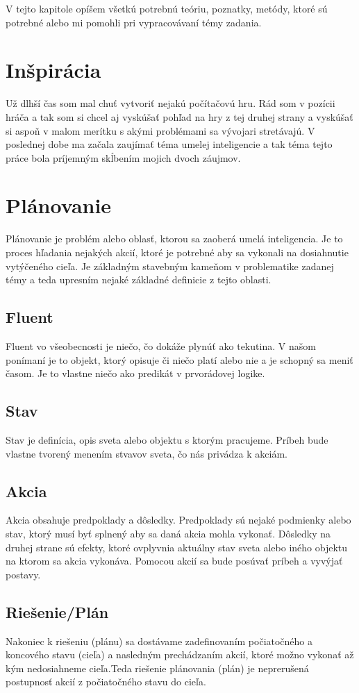 V tejto kapitole opíšem všetkú potrebnú teóriu, poznatky, metódy, ktoré sú potrebné alebo mi pomohli pri vypracovávaní témy zadania.

\section{Inšpirácia}
Už dlhší čas som mal chuť vytvoriť nejakú počítačovú hru. Rád som v pozícii hráča a tak som si chcel aj vyskúšať pohľad na hry z tej druhej strany a vyskúšať si aspoň v malom merítku s akými problémami sa vývojari stretávajú. V poslednej dobe ma začala zaujímať téma umelej inteligencie a tak téma tejto práce bola príjemným skĺbením mojich dvoch záujmov.

\section{Plánovanie}
Plánovanie je problém alebo oblasť, ktorou sa zaoberá umelá inteligencia. Je to proces hľadania nejakých akcií, ktoré je potrebné aby sa vykonali na dosiahnutie vytýčeného cieľa. Je základným stavebným kameňom v problematike zadanej témy a teda upresním nejaké základné definicie z tejto oblasti.
\subsection{Fluent}
Fluent vo všeobecnosti je niečo, čo dokáže plynúť ako tekutina. V našom ponímaní je to objekt, ktorý opisuje či niečo platí alebo nie a je schopný sa meniť časom. Je to vlastne niečo ako predikát v prvorádovej logike.
\subsection{Stav}
Stav je definícia, opis sveta alebo objektu s ktorým pracujeme. Príbeh bude vlastne tvorený menením stvavov sveta, čo nás privádza k akciám.
\subsection{Akcia}
Akcia obsahuje predpoklady a dôsledky. Predpoklady sú nejaké podmienky alebo stav, ktorý musí byť splnený aby sa daná akcia mohla vykonať. Dôsledky na druhej strane sú efekty, ktoré ovplyvnia aktuálny stav sveta alebo iného objektu na ktorom sa akcia vykonáva. Pomocou akcií sa bude posúvať príbeh a vyvýjať postavy.
\subsection{Riešenie/Plán}
Nakoniec k riešeniu (plánu) sa dostávame zadefinovaním počiatočného a koncového stavu (cieľa) a nasledným prechádzaním akcií, ktoré možno vykonať až kým nedosiahneme cieľa.Teda riešenie plánovania (plán) je neprerušená postupnosť akcií z počiatočného stavu do cieľa.

